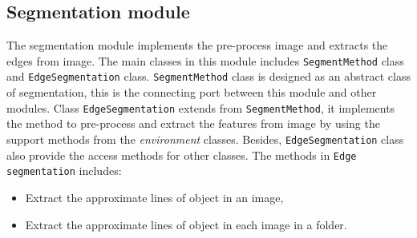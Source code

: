 \subsection{Segmentation module}
The segmentation module implements the pre-process image and extracts the edges from image. The main classes in this module includes \texttt{SegmentMethod} class and \texttt{EdgeSegmentation} class. \texttt{SegmentMethod} class is designed as an abstract class of segmentation, this is the connecting port between this module and other modules. Class \texttt{EdgeSegmentation} extends from \texttt{SegmentMethod}, it implements the method to pre-process and extract the features from image by using the support methods from the \textit{environment} classes. Besides, \texttt{EdgeSegmentation} class also provide the access methods for other classes. The methods in \texttt{Edge segmentation} includes:
\begin{itemize}
\item Extract the approximate lines of object in an image,
\item Extract the approximate lines of object in each image in a folder.
\end{itemize}
